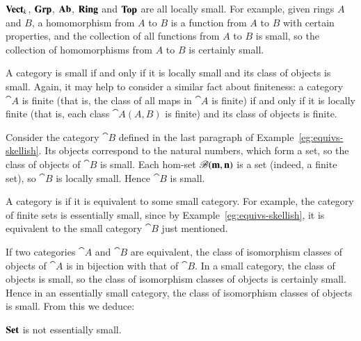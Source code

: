 \begin{example}
%
%
%
%
%
%
$\mathbf{Vect}_k$, $\mathbf{Grp}$, $\mathbf{Ab}$, $\mathbf{Ring}$ and $\mathbf{Top}$ are all locally small.  For
example, given rings $A$ and $B$, a homomorphism from $A$ to $B$ is a
function from $A$ to $B$ with certain properties, and the collection of all
functions from $A$ to $B$ is small, so the collection of homomorphisms from
$A$ to $B$ is certainly small.
\end{example}

A category is small if and only if it is locally small and its class of
objects is small.  Again, it may help to consider a similar fact about
finiteness: a category $\cat{A}$ is finite (that is, the class of all maps
in $\cat{A}$ is finite) if and only if it is locally finite (that is, each
class $\cat{A}(A, B)$ is finite) and its class of objects is finite.

\begin{example}
\label{eg:FinSet-skel}
Consider the category $\cat{B}$ defined in the last paragraph of
Example~\ref{eg:equivs-skellish}.  Its objects correspond to the natural
numbers, which form a set, so the class of objects of $\cat{B}$ is small.
Each hom-set $\mathscr{B}(\mathbf{m}, \mathbf{n})$ is a set (indeed, a finite set),
so $\cat{B}$ is locally small.  Hence $\cat{B}$ is small.
\end{example}

A category is %
%
%
%
if it is equivalent to some small category.  For example, the category of
finite%
%
%
sets is essentially small, since by Example~\ref{eg:equivs-skellish}, it is
equivalent to the small category $\cat{B}$ just mentioned.

If two categories $\cat{A}$ and $\cat{B}$ are equivalent, the class of
isomorphism classes of objects of $\cat{A}$ is in bijection with that of
$\cat{B}$.  In a small category, the class of objects is small, so the
class of isomorphism classes of objects is certainly small.  Hence in an
essentially small category, the class of isomorphism classes of objects is
small.  From this we deduce:

\begin{propn}
\label{propn:Set-large}
%
$\mathbf{Set}$ is not essentially small.
\end{propn}

